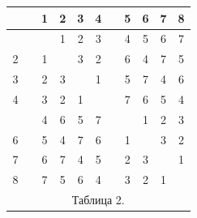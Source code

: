 \begin{center}


\begin{tabular}{ccccccccccc}


\ & \vline & 1 & 2 & 3 & 4 & \vline & 5 & 6 & 7 & 8 \\


\hline


 1 & \vline & \ & 1 & 2 & 3 & \vline & 4 & 5 & 6 & 7 \\


2 & \vline & 1 & \ & 3 & 2 & \vline & 6 & 4 & 7 & 5 \\


3 & \vline & 2 & 3 & \ & 1 & \vline & 5 & 7 & 4 & 6 \\


4 & \vline & 3 & 2 & 1 & \ & \vline & 7 & 6 & 5 & 4 \\


\hline


 5 & \vline & 4 & 6 & 5 & 7 & \vline & \ & 1 & 2 & 3 \\


6 & \vline & 5 & 4 & 7 & 6 & \vline & 1 & \ & 3 & 2 \\


7 & \vline & 6 & 7 & 4 & 5 & \vline & 2 & 3 & \ & 1 \\


8 & \vline & 7 & 5 & 6 & 4 & \vline & 3 & 2 & 1 & \ \\


\multicolumn{11}{c}{ Таблица 2.}


\end{tabular}


\end{center}


